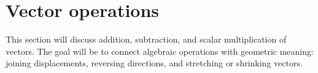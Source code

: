 \section{Vector operations}

This section will discuss addition, subtraction, and scalar multiplication of vectors. The goal will be to connect algebraic operations with geometric meaning: joining displacements, reversing directions, and stretching or shrinking vectors.
